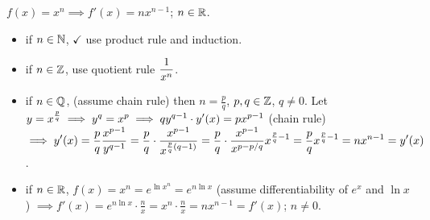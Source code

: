 \documentclass[]{article}
\begin{document}
\begin{proposition}
	 $f(x) = x^n \implies f'(x) = nx^{n-1}$; $n\in\mathbb{R}$.
\end{proposition}
\begin{itemize}
	\item if $n\in\mathbb{N}$, $\checkmark$ use product rule and induction.
	\item if $n\in\mathbb{Z}$, use quotient rule $\displaystyle\frac1{x^n}$.
	\item if $n\in\mathbb{Q}$, (assume chain rule) then $n=\frac pq$, $p,q\in\mathbb{Z}$, $q\neq 0$.
		Let $\displaystyle y=x^{\frac pq} \implies y^q = x^p \implies qy^{q-1}\cdot y'(x) = px^{p-1}$ (chain rule) $\displaystyle\implies y'(x) = \frac pq \frac{x^{p-1}}{y^{q-1}} = \frac pq\cdot \frac {x^{p-1}}{x^{\frac pq(q-1)}} = \frac pq\cdot \frac{x^{p-1}}{x^{p-p/q}}x^{\frac pq-1} = \frac pqx^{\frac pq-1} = nx^{n-1}=y'(x)$.
	\item if $n\in\mathbb{R}$, $f(x) = x^n = e^{\ln x^n} = e^{n\ln x}$ (assume differentiability of $e^x$ and $\ln x$) $\implies f'(x) = e^{n\ln x}\cdot \frac nx = x^n\cdot\frac nx = nx^{n-1} = f'(x)$; $n\neq0$.
\end{itemize}
\end{document}
